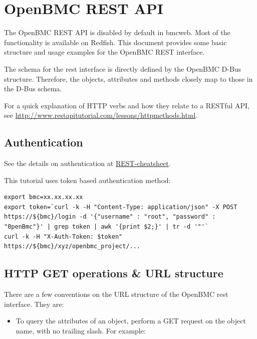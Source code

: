 \hypertarget{openbmc-rest-api}{%
\section{OpenBMC REST API}\label{openbmc-rest-api}}

The OpenBMC REST API is disabled by default in bmcweb. Most of the
functionality is available on Redfish. This document provides some basic
structure and usage examples for the OpenBMC REST interface.

The schema for the rest interface is directly defined by the OpenBMC
D-Bus structure. Therefore, the objects, attributes and methods closely
map to those in the D-Bus schema.

For a quick explanation of HTTP verbs and how they relate to a RESTful
API, see \url{http://www.restapitutorial.com/lessons/httpmethods.html}.

\hypertarget{authentication}{%
\subsection{Authentication}\label{authentication}}

See the details on authentication at
\href{https://github.com/openbmc/docs/blob/master/REST-cheatsheet.md\#establish-rest-connection-session}{REST-cheatsheet}.

This tutorial uses token based authentication method:

\begin{verbatim}
export bmc=xx.xx.xx.xx
export token=`curl -k -H "Content-Type: application/json" -X POST https://${bmc}/login -d '{"username" : "root", "password" : "0penBmc"}' | grep token | awk '{print $2;}' | tr -d '"'`
curl -k -H "X-Auth-Token: $token" https://${bmc}/xyz/openbmc_project/...
\end{verbatim}

\hypertarget{http-get-operations-url-structure}{%
\subsection{HTTP GET operations \& URL
structure}\label{http-get-operations-url-structure}}

There are a few conventions on the URL structure of the OpenBMC rest
interface. They are:

\begin{itemize}
\tightlist
\item
  To query the attributes of an object, perform a GET request on the
  object name, with no trailing slash. For example:
\end{itemize}

